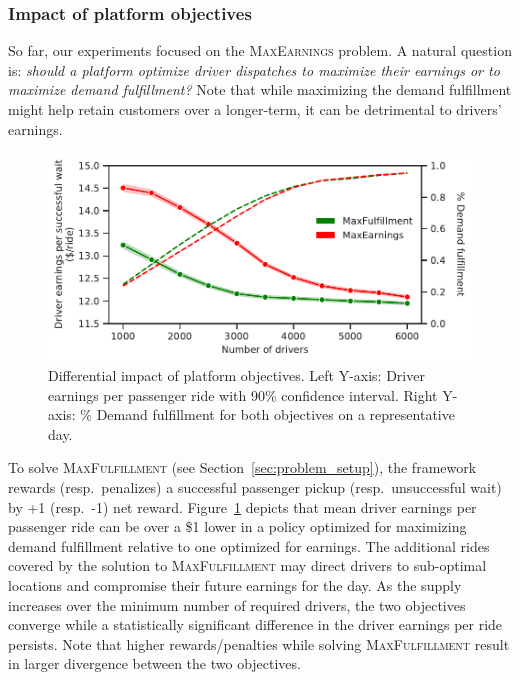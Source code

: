 \subsubsection{Impact of platform objectives}
So far, our experiments focused on the \textsc{MaxEarnings} problem.
A natural question is: \textit{should a platform optimize driver dispatches to maximize their earnings 
    or to maximize demand fulfillment?}
Note that while maximizing the demand fulfillment might help retain customers 
    over a longer-term, it can
    be detrimental to drivers' earnings.
\begin{figure}
	\centering
	\includegraphics[scale=0.5]{figures/pickups_vs_revenue_objective_2.pdf}
    \caption{Differential impact of platform objectives.
    Left Y-axis: Driver earnings per passenger ride 
    with 90\% confidence interval.
    Right Y-axis: \% Demand fulfillment for both objectives on a 
    representative day.}
	\label{fig:pickups_vs_revenue_objective}
\end{figure}
To solve \textsc{MaxFulfillment} (see Section~\ref{sec:problem_setup}),
the framework rewards (resp.\ penalizes) a
successful passenger pickup (resp.\ unsuccessful wait) by +1 (resp.\ -1)
net reward.
Figure~\ref{fig:pickups_vs_revenue_objective} depicts that mean driver earnings 
    per passenger ride can be over a \$1 lower in a policy optimized for 
    maximizing demand fulfillment relative to one optimized for earnings.
The additional rides covered by the solution to \textsc{MaxFulfillment} may  
    direct drivers to sub-optimal locations
    and compromise their future earnings for the day.
As the supply increases over the minimum number of required drivers, the 
    two objectives converge while a statistically significant difference in 
    the driver earnings per ride persists.
Note that higher rewards/penalties while solving 
    \textsc{MaxFulfillment} result in larger divergence between the 
    two objectives.

